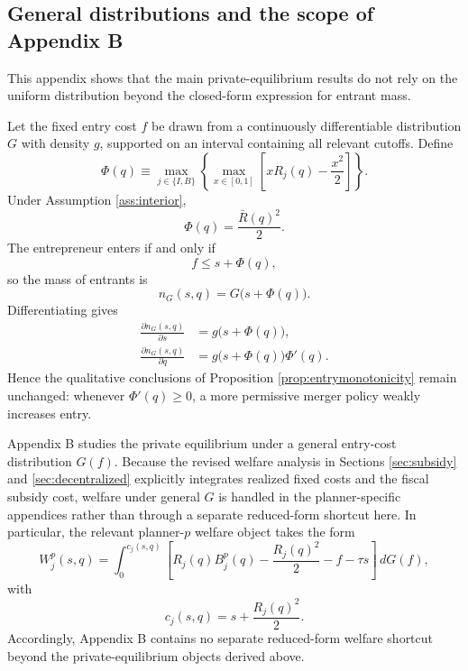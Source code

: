 \subsection{General distributions and the scope of Appendix B}\label{app:generalG}

This appendix shows that the main private-equilibrium results do not rely on the uniform distribution beyond the closed-form expression for entrant mass.

Let the fixed entry cost \(f\) be drawn from a continuously differentiable distribution \(G\) with density \(g\), supported on an interval containing all relevant cutoffs.
Define
\begin{equation}
    \Phi(q)\equiv
    \max_{j \in \{I,B\}}
    \left\{
        \max_{x \in [0,1]}
        \left[
            xR_j(q)-\frac{x^2}{2}
        \right]
    \right\}.
\end{equation}
Under Assumption \ref{ass:interior},
\begin{equation}
    \Phi(q)=\frac{\bar R(q)^2}{2}.
\end{equation}
The entrepreneur enters if and only if
\begin{equation}
    f \le s+\Phi(q),
\end{equation}
so the mass of entrants is
\begin{equation}
    n_G(s,q)=G\bigl(s+\Phi(q)\bigr).
\end{equation}
Differentiating gives
\begin{align}
    \frac{\partial n_G(s,q)}{\partial s}
    &= g\bigl(s+\Phi(q)\bigr), \\
    \frac{\partial n_G(s,q)}{\partial q}
    &= g\bigl(s+\Phi(q)\bigr)\Phi'(q).
\end{align}
Hence the qualitative conclusions of Proposition \ref{prop:entrymonotonicity} remain unchanged:
whenever \(\Phi'(q)\ge 0\), a more permissive merger policy weakly increases entry.

Appendix B studies the private equilibrium under a general entry-cost distribution \(G(f)\).
Because the revised welfare analysis in Sections \ref{sec:subsidy} and \ref{sec:decentralized}
explicitly integrates realized fixed costs and the fiscal subsidy cost, welfare under general \(G\)
is handled in the planner-specific appendices rather than through a separate reduced-form shortcut
here. In particular, the relevant planner-\(p\) welfare object takes the form
\begin{equation}
    W_j^p(s,q)
    =
    \int_0^{c_j(s,q)}
    \left[
        R_j(q)B_j^p(q)-\frac{R_j(q)^2}{2}-f-\tau s
    \right]\,dG(f),
\end{equation}
with
\begin{equation}
    c_j(s,q)=s+\frac{R_j(q)^2}{2}.
\end{equation}
Accordingly, Appendix B contains no separate reduced-form welfare shortcut beyond the
private-equilibrium objects derived above.
